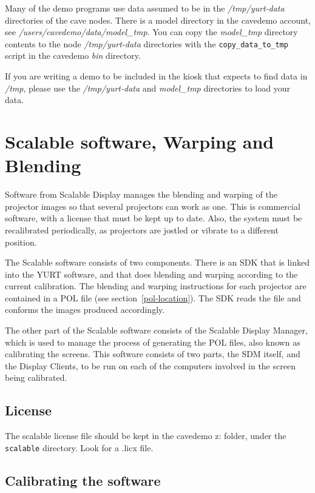 \documentclass[11pt]{article}
\newcommand{\yurt}{YURT\xspace}
\newcommand{\cmd}[1]{\texttt{#1}\xspace}
\newcommand{\dir}[1]{\textit{#1}\xspace}
\begin{document}
Many of the demo programs use data assumed to be in the
\dir{/tmp/yurt-data} directories of the cave nodes.  There is a model
directory in the cavedemo account, see
\dir{/users/cavedemo/data/model\_tmp}.  You can copy the
\dir{model\_tmp} directory contents to the node \dir{/tmp/yurt-data}
directories with the \cmd{copy\_data\_to\_tmp} script in the cavedemo
\dir{bin} directory.

If you are writing a demo to be included in the kiosk that expects to
find data in \dir{/tmp}, please use the  \dir{/tmp/yurt-data} and
\dir{model\_tmp} directories to load your data.


\section{Scalable software, Warping and Blending}

Software from Scalable Display manages the blending and warping of the
projector images so that several projectors can work as one.  This is
commercial software, with a license that must be kept up to date.
Also, the system must be recalibrated periodically, as projectors are
jostled or vibrate to a different position.

The Scalable software consists of two components.  There is an SDK
that is linked into the \yurt software, and that does blending and
warping according to the current calibration.  The blending and
warping instructions for each projector are contained in a POL file
(see section~\ref{pol-location}).  The SDK reads the file and conforms
the images produced accordingly.

The other part of the Scalable software consists of the Scalable
Display Manager, which is used to manage the process of generating the
POL files, also known as calibrating the screens.  This software
consists of two parts, the SDM itself, and the Display Clients,
to be run on each of the computers involved in the screen being
calibrated.  

\subsection{License}

The scalable license file should be kept in the cavedemo z: folder,
under the \cmd{scalable} directory.  Look for a .licx file.

\subsection{Calibrating the software}
\end{document}
